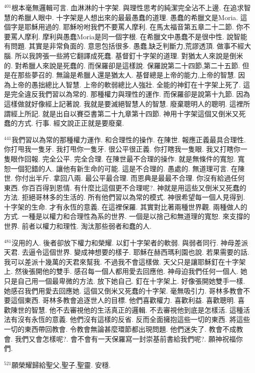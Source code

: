 \documentclass{book}
\begin{document}
$^{401}$根本毫無邏輯可言.
血淋淋的十字架.
與理性思考的純潔完全沾不上邊.
在追求智慧的希臘人眼中.
十字架是人想出來的最最愚蠢的道理.
愚蠢的希臘文是Moria.
這個字是耶穌用過的.
耶穌吩咐我們不要罵人摩利.
在馬太福音第五章二十二節.
你不要罵人摩利.
摩利與愚蠢Moria是同一個字根.
在希臘文中愚蠢不是很中性.
說智能有問題.
其實是非常負面的.
意思包括很多.
愚蠢,缺乏判斷力,荒謬透頂.
做事不經大腦.
所以我誇張一些將它翻譯成死蠢.
基督釘十字架的道理.
對猶太人來說是倒米的.
對希臘人來說是死蠢的.
而保羅卻是這樣說.
保羅說第二十四節,第二十五節.
但是在那些夢召的.
無論是希臘人還是猶太人.
基督總是上帝的能力,上帝的智慧.
因為上帝的愚拙總比人智慧.
上帝的軟弱總比人強壯.
全能的神釘在十字架上死了.
這是完全違反我們習以為常的.
那種權力與理性的運作.
而保羅卻是說第十九節.
因為這樣做就好像經上記著說.
我就是要滅絕智慧人的智慧.
廢棄聰明人的聰明.
這裡所謂經上所記.
就是出自以賽亞書第二十九章第十四節.
神用十字架這個又倒米又死蠢的方式.
行事.
經文說正正就是要廢棄.

$^{441}$我們習以為常的那種權力運作.
和合理性的操作.
在陳世.
報應正義最具合理性.
你打甩我一隻牙.
我打甩你一隻牙.
很公平很正義.
你打瞎我一隻眼.
我又打瞎你一隻眼作回報.
完全公平.
完全合理.
在陳世最不合理的操作.
就是無條件的寬恕.
寬恕一個犯錯的人.
讓他有新生命的可能.
這是不合理的.
愚處的.
無道理可言.
在陳世.
你付出半斤.
拿回八兩.
最公平最合理.
而恩典是最最不合理.
你沒有給過任何東西.
你百百得到恩情.
有什麼比這個更不合理呢?.
神就是用這些又倒米又死蠢的方法.
拒絕哥林多的生活的.
所有他們習以為常的模式.
神很希望每一個人見得到.
十字架的生命.
才有永恆的意義.
在這裡保羅.
其實對比著兩種世界觀.
兩種做人的方式.
一種是以權力和合理性為系的世界.
一個是以捨己和無道理的寬恕.
來支撐的世界.
前者以權力和理性.
淘汰那些弱者和蠢的人.

$^{481}$沒用的人.
後者卻放下權力和榮耀.
以釘十字架者的軟弱.
與弱者同行.
神母差派天君.
去逼令這個世界.
變成神想要的樣子.
耶穌在赫西瑪利園也說.
若果需要的話.
我可以差派十幾萬的天君來幫我.
不過我不會這樣做.
天父只是讓耶穌釘在十字架上.
然後張開他的雙手.
感召每一個人都用愛去回應他.
神母迫我們任何一個人.
她只是自己用一個最卑微的方法.
放下她自己.
釘在十字架上.
好像張開她雙手一樣.
她感召我們用愛去回應她.
這個又倒米又死蠢的十字架.
毫無吸引力.
哥林多教會不要這個東西.
哥林多教會追逐世人的目標.
他們喜歡權力.
喜歡利益.
喜歡聰明.
喜歡陳世的智慧.
他不去審視他的生活真正的邏輯.
不去審視他到底是怎樣活.
這種活法有沒有永恆的意義.
他們沒有這樣的反省.
反而全面擁抱這些一切的東西.
將這些一切的東西帶回教會.
令教會無論甚麼環節都出現問題.
他們迷失了.
教會不成教會.
我們又會怎樣呢?.
會不會有一天保羅寫一封崇基前書給我們呢?.
願神祝福你們.

$^{521}$願榮耀歸給聖父,聖子,聖靈.
安穩.
\newpage
\end{document}
